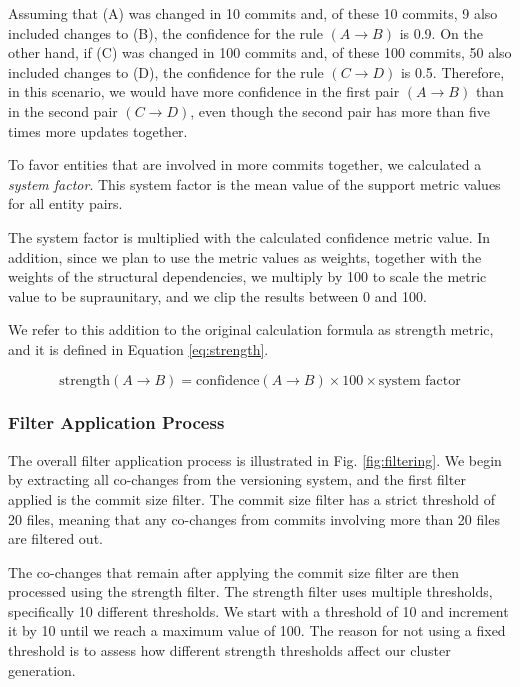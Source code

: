 \documentclass{ieeeaccess}
\begin{document}
Assuming that (A) was changed in 10 commits and, of these 10 commits, 9 also included changes to (B), the confidence for the rule $(A \rightarrow B)$ is 0.9. On the other hand, if (C) was changed in 100 commits and, of these 100 commits, 50 also included changes to (D), the confidence for the rule $(C \rightarrow D)$ is 0.5. Therefore, in this scenario, we would have more confidence in the first pair $(A \rightarrow B)$ than in the second pair $(C \rightarrow D)$, even though the second pair has more than five times more updates together.

To favor entities that are involved in more commits together, we calculated a \textit{system factor}. This system factor is the mean value of the support metric values for all entity pairs.

The system factor is multiplied with the calculated confidence metric value. In addition, since we plan to use the metric values as weights, together with the weights of the structural dependencies, we multiply by 100 to scale the metric value to be supraunitary, and we clip the results between 0 and 100.


We refer to this addition to the original calculation formula as strength metric, and it is defined in Equation \eqref{eq:strength}.

\begin{equation}
\text{strength}(A \rightarrow B) = \text{confidence}(A \rightarrow B) \times 100 \times \text{system factor} 
\label{eq:strength}
\end{equation}


\subsubsection{Filter Application Process}

The overall filter application process is illustrated in Fig. \ref{fig:filtering}.  We begin by extracting all co-changes from the versioning system, and the first filter applied is the commit size filter. The commit size filter has a strict threshold of 20 files, meaning that any co-changes from commits involving more than 20 files are filtered out.

The co-changes that remain after applying the commit size filter are then processed using the strength filter. The strength filter uses multiple thresholds, specifically 10 different thresholds. We start with a threshold of 10 and increment it by 10 until we reach a maximum value of 100. The reason for not using a fixed threshold is to assess how different strength thresholds affect our cluster generation. 
\end{document}
